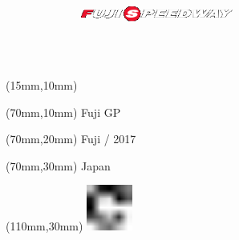 \null\newpage
\begin{textblock*}{50mm}(15mm,10mm)%
\includegraphics[width=50mm]{LG/FUJ.png}
\end{textblock*}
\begin{textblock*}{130mm}(70mm,10mm)%
{\fontsize{20}{20}\selectfont Fuji GP}\\
\end{textblock*}
\begin{textblock*}{120mm}(70mm,20mm)%
{\fontsize{16}{16}\selectfont Fuji / 2017}\\
\end{textblock*}
\begin{textblock*}{120mm}(70mm,30mm)%
{\fontsize{12}{12}\selectfont Japan}
\end{textblock*}
\begin{textblock*}{30mm}(110mm,30mm)%
\centering
\includegraphics[height=15mm]{icons/fa-rotate-right.pdf}
\end{textblock*}
